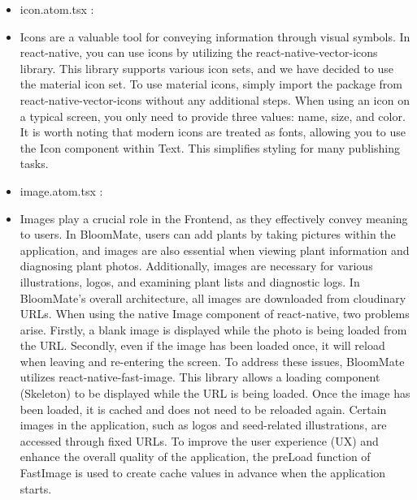 \documentclass[conference, a4paper]{IEEEtran}
\begin{document}
\begin{enumerate}
\begin{enumerate}
\begin{itemize}
        \item icon.atom.tsx :
        \item[] Icons are a valuable tool for conveying information through visual symbols. In react-native, you can use icons by utilizing the react-native-vector-icons library. This library supports various icon sets, and we have decided to use the material icon set. To use material icons, simply import the package from react-native-vector-icons without any additional steps. When using an icon on a typical screen, you only need to provide three values: name, size, and color. It is worth noting that modern icons are treated as fonts, allowing you to use the Icon component within Text. This simplifies styling for many publishing tasks. \\

        \item image.atom.tsx : 
        \item[] Images play a crucial role in the Frontend, as they effectively convey meaning to users. In BloomMate, users can add plants by taking pictures within the application, and images are also essential when viewing plant information and diagnosing plant photos. Additionally, images are necessary for various illustrations, logos, and examining plant lists and diagnostic logs. In BloomMate's overall architecture, all images are downloaded from cloudinary URLs. When using the native Image component of react-native, two problems arise. Firstly, a blank image is displayed while the photo is being loaded from the URL. Secondly, even if the image has been loaded once, it will reload when leaving and re-entering the screen. To address these issues, BloomMate utilizes react-native-fast-image. This library allows a loading component (Skeleton) to be displayed while the URL is being loaded. Once the image has been loaded, it is cached and does not need to be reloaded again. Certain images in the application, such as logos and seed-related illustrations, are accessed through fixed URLs. To improve the user experience (UX) and enhance the overall quality of the application, the preLoad function of FastImage is used to create cache values in advance when the application starts. \\


\end{itemize}
\end{enumerate}
\end{enumerate}
\end{document}
